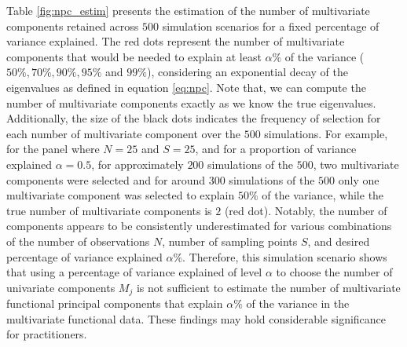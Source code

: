 Table \ref{fig:npc_estim} presents the estimation of the number of multivariate components retained across $500$ simulation scenarios for a fixed percentage of variance explained. The red dots represent the number of multivariate components that would be needed to explain at least $\alpha\%$ of the variance ($50\%, 70\%, 90\%, 95\%$ and $99\%$), considering an exponential decay of the eigenvalues as defined in equation \eqref{eq:npc}. Note that, we can compute the number of multivariate components exactly as we know the true eigenvalues. Additionally, the size of the black dots indicates the frequency of selection for each number of multivariate component over the $500$ simulations. For example, for the panel where $N = 25$ and $S = 25$, and for a proportion of variance explained $\alpha = 0.5$, for approximately $200$ simulations of the $500$, two multivariate components were selected and for around $300$ simulations of the $500$ only one multivariate component was selected to explain $50\%$ of the variance, while the true number of multivariate components is $2$ (red dot). Notably, the number of components appears to be consistently underestimated for various combinations of the number of observations $N$, number of sampling points $S$, and desired percentage of variance explained $\alpha\%$. Therefore, this simulation scenario shows that using a percentage of variance explained of level $\alpha$ to choose the number of univariate components $M_j$ is not sufficient to estimate the number of multivariate functional principal components that explain $\alpha\%$ of the variance in the multivariate functional data. These findings may hold considerable significance for practitioners.
